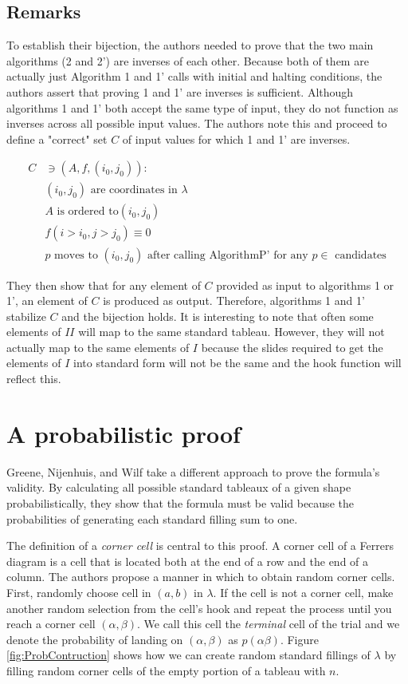 \documentclass[11pt]{article}
\theoremstyle{definition}
\begin{document}
\subsection{Remarks}
To establish their bijection, the authors needed to prove that the two main algorithms (2 and 2') are inverses of each other. Because both of them are actually just Algorithm 1 and 1' calls with initial and halting conditions, the authors assert that proving 1 and 1' are inverses is sufficient. Although algorithms 1 and 1' both accept the same type of input, they do not function as inverses across all possible input values. The authors note this and proceed to define a "correct" set $C$ of input values for which 1 and 1' are inverses.

\begin{equation*}
\begin{split}
    C &\ni (A,f,(i_0,j_0)): \\
      & (i_0,j_0) \text{ are coordinates in } \lambda \\
      & A \text{ is ordered to} (i_0,j_0) \\
      & f(i > i_0,j > j_0) \equiv 0 \\
      & p \text{ moves to } (i_0,j_0) \text{ after calling AlgorithmP' for any } p \in \text{ candidates}
\end{split}
\end{equation*}

They then show that for any element of $C$ provided as input to algorithms 1 or 1', an element of $C$ is produced as output. Therefore, algorithms 1 and 1' stabilize $C$ and the bijection holds. It is interesting to note that often some elements of $II$ will map to the same standard tableau. However, they will not actually map to the same elements of $I$ because the slides required to get the elements of $I$ into standard form will not be the same and the hook function will reflect this.


\section{A probabilistic proof}
Greene, Nijenhuis, and Wilf take a different approach to prove the formula's validity. By calculating all possible standard tableaux of a given shape probabilistically, they show that the formula must be valid because the probabilities of generating each standard filling sum to one. 

The definition of a \emph{corner cell} is central to this proof. A corner cell of a Ferrers diagram is a cell that is located both at the end of a row and the end of a column. The authors propose a manner in which to obtain random corner cells. First, randomly choose cell in $(a,b)$ in $\lambda$. If the cell is not a corner cell, make another random selection from the cell's hook and repeat the process until you reach a corner cell $(\alpha,\beta)$. We call this cell the \emph{terminal} cell of the trial and we denote the probability of landing on $(\alpha,\beta)$ as $p(\alpha\beta)$. 
Figure \ref{fig:ProbContruction} shows how we can create random standard fillings of $\lambda$ by filling random corner cells of the empty portion of a tableau with $n$.
\end{document}
